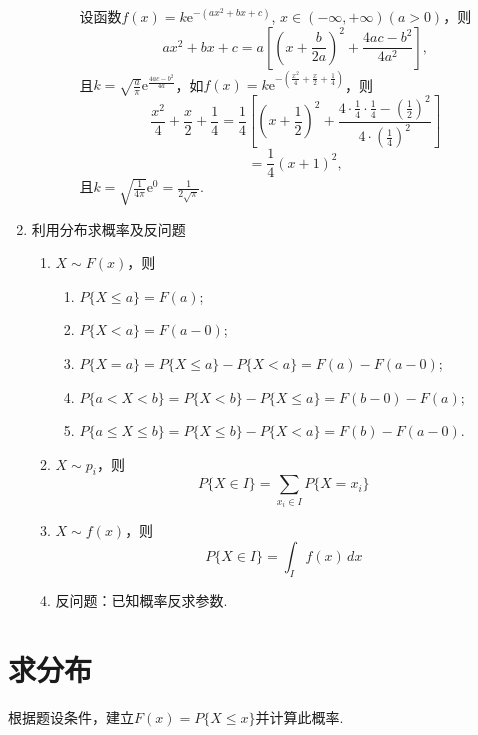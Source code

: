 \begin{enumerate}
\begin{enumerate}
\begin{note}{}{}
\begin{enumerate}
                                  设函数$f(x)=k\mathrm{e}^{-(ax^2+bx+c)}$, $x\in(-\infty,+\infty)(a>0)$，则
                                  $$
                                      ax^2+bx+c=a\left[\left(x+\frac{b}{2a}\right)^2+\frac{4ac-b^2}{4a^2}\right],$$
                                  且$k=\sqrt{\frac{a}{\pi}}\mathrm{e}^{\frac{4ac-b^2}{4a}}$，如$f(x)=k\mathrm{e}^{-\left(\frac{x^2}{4}+\frac{x}{2}+\frac{1}{4}\right)}$，则
                                  $$\frac{x^2}{4}+\frac{x}{2}+\frac{1}{4}=\frac{1}{4}\left[\left(x+\frac{1}{2}\right)^2+\frac{4\cdot\frac{1}{4}\cdot\frac{1}{4}-\left(\frac{1}{2}\right)^2}{4\cdot\left(\frac{1}{4}\right)^2}\right]$$
                                  $$
                                      =\frac{1}{4}(x+1)^2,$$
                                  且$k=\sqrt{\frac{1}{4\pi}}\mathrm{e}^0=\frac{1}{2\sqrt{\pi}}$.
                        \end{enumerate}
                    \end{note}
          \end{enumerate}
    \item 利用分布求概率及反问题
          \begin{enumerate}
              \item  $X \sim F(x)$，则
                    \begin{enumerate}
                        \item  $P\{X \leqslant a\} = F(a)$;
                        \item  $P\{X < a\} = F(a-0)$;
                        \item  $P\{X = a\} = P\{X \leqslant a\} - P\{X < a\} = F(a) - F(a-0)$;
                        \item  $P\{a < X < b\} = P\{X < b\} - P\{X \leqslant a\} = F(b-0) - F(a)$;
                        \item  $P\{a \leqslant X \leqslant b\} = P\{X \leqslant b\} - P\{X < a\} = F(b) - F(a-0)$.
                    \end{enumerate}
              \item $X \sim p_{i}$，则
                    $$P\{X \in I\} = \sum_{x_{i} \in I} P\{X = x_{i}\}$$
              \item $X \sim f(x)$，则
                    $$P\{X \in I\} = \int_{I} f(x) \, dx$$
              \item 反问题：已知概率反求参数.
          \end{enumerate}
\end{enumerate}

\section{求分布}
\DOne

根据题设条件，建立$F(x) = P\{X\leq x\}$并计算此概率.